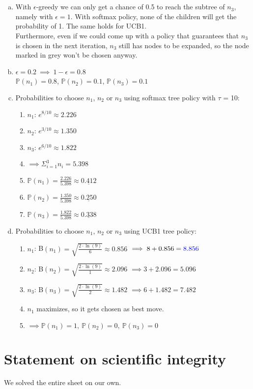 \documentclass{article} %
\begin{document}
\section{}
\begin{enumerate}[(a)]
    \item With $\epsilon$-greedy we can only get a chance of
    0.5 to reach the subtree of $n_3$, namely with $\epsilon
    = 1$. With softmax policy, none of the children will get
    the probability of 1. The same holds for UCB1.\\
    Furthermore, even if we could come up with a policy
    that guarantees that $n_3$ is chosen in the next iteration,
    $n_3$ still has nodes to be expanded, so the node marked
    in grey won't be chosen anyway.
    \item $\epsilon = 0.2 \ \implies \ 1 - \epsilon = 0.8$\\
    $\mathbb{P}(n_1) = 0.8$, 
    $\mathbb{P}(n_2) = 0.1$, 
    $\mathbb{P}(n_3) = 0.1$
    \item Probabilities to choose $n_1$, $n_2$ or $n_3$ using
    softmax tree policy with $\tau$ = 10:
    \begin{enumerate}[]
        \item $n_1$: $e^{8/10} \approx 2.226$
        \item $n_2$: $e^{3/10} \approx 1.350$
        \item $n_3$: $e^{6/10} \approx 1.822$
        \item $\implies \Sigma_{i=1}^3 n_i = 5.398$
        \item $\mathbb{P}(n_1) = \frac{2.226}{5.398} \approx \underline{0.412}$
        \item $\mathbb{P}(n_2) = \frac{1.350}{5.398} \approx \underline{0.250}$
        \item $\mathbb{P}(n_3) = \frac{1.822}{5.398} \approx \underline{0.338}$
    \end{enumerate}
    \item Probabilities to choose $n_1$, $n_2$ or $n_3$ using
    UCB1 tree policy:
    \begin{enumerate}[]
        \item $n_1$: B$(n_1) = \sqrt{\frac{2 \cdot \ln(9)}{6}} \approx 0.856$ 
        $\implies 8 + 0.856 = \color{blue}8.856\color{black}$
        \item $n_2$: B$(n_2) = \sqrt{\frac{2 \cdot \ln(9)}{1}} \approx 2.096$ 
        $\implies 3 + 2.096 = 5.096$
        \item $n_3$: B$(n_3) = \sqrt{\frac{2 \cdot \ln(9)}{2}} \approx 1.482$ 
        $\implies 6 + 1.482 = 7.482$
        \item $n_1$ maximizes, so it gets chosen as best move.
        \item $\implies \mathbb{P}(n_1) = 1, \ \mathbb{P}(n_2) = 0, \
        \mathbb{P}(n_3) = 0$
    \end{enumerate}
\end{enumerate}

\section*{Statement on scientific integrity}
We solved the entire sheet on our own.
\end{document}
